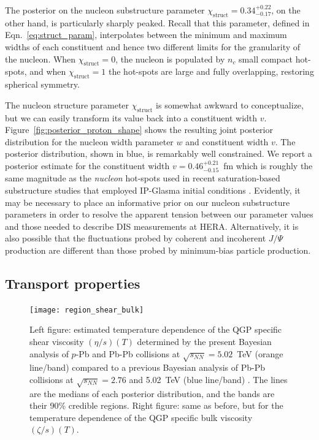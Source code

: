 \documentclass[aps,prc,reprint,amsmath,nofootinbib]{revtex4-1}
\newcommand{\sqrts}{\sqrt{s_{NN}}}
\newcommand{\X}{\chi_\text{struct}}
\begin{document}
The posterior on the nucleon substructure parameter $\X=0.34_{-0.17}^{+0.22}$, on the other hand, is particularly sharply peaked.
Recall that this parameter, defined in Eqn.~\eqref{eq:struct_param}, interpolates between the minimum and maximum widths of each constituent and hence
two different limits for the granularity of the nucleon.
When $\X=0$, the nucleon is populated by $n_c$ small compact hot-spots, and when $\X=1$ the hot-spots are large and fully overlapping, restoring spherical symmetry.

The nucleon structure parameter $\X$ is somewhat awkward to conceptualize, but we can easily transform its value back into a constituent width $v$.
Figure~\ref{fig:posterior_proton_shape} shows the resulting joint posterior distribution for the nucleon width parameter $w$ and constituent width $v$.
The posterior distribution, shown in blue, is remarkably well constrained.
We report a posterior estimate for the constituent width $v=0.46_{-0.15}^{+0.21}$~fm which is roughly the same magnitude as the \emph{nucleon} hot-spots used in recent saturation-based substructure studies that employed IP-Glasma initial conditions \cite{Schenke:2018fci}.
Evidently, it may be necessary to place an informative prior on our nucleon substructure parameters in order to resolve the apparent tension between our parameter values and those needed to describe DIS measurements at HERA.
Alternatively, it is also possible that the fluctuations probed by coherent and incoherent $J/\Psi$ production are different than those probed by minimum-bias particle production.

\subsection{Transport properties}

\begin{figure}
  \texttt{[image: region\_shear\_bulk]}
  \caption{
    \label{fig:region_shear_bulk}
    Left figure: estimated temperature dependence of the QGP specific shear viscosity $(\eta/s)(T)$ determined by the present Bayesian analysis of $p$-Pb and Pb-Pb collisions at $\sqrts=5.02$~TeV (orange line/band) compared to a previous Bayesian analysis of Pb-Pb collisions at $\sqrts=2.76$ and 5.02~TeV (blue line/band) \cite{Bernhard:2018hnz}.
    The lines are the medians of each posterior distribution, and the bands are their 90\% credible regions.
    Right figure: same as before, but for the temperature dependence of the QGP specific bulk viscosity $(\zeta/s)(T)$.
  }
\end{figure}
\end{document}
